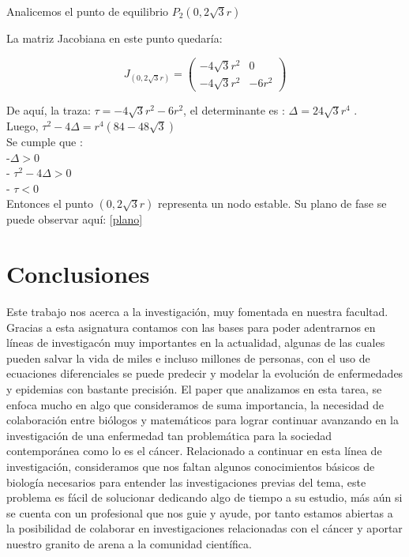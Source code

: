 \documentclass[a4 paper, 12pt]{article}
\begin{document}
Analicemos el punto de equilibrio $ P_{2} (0,2\sqrt{3}r)$

La matriz Jacobiana en este punto quedar\'ia:

\begin{displaymath}
  J_{(0,2\sqrt{3}r)} =    \left(
      \begin{array}{cc}
        - 4 \sqrt{3}r^{2}  & 0  \\
      - 4 \sqrt{3}r^{2} & -6r^2
      \end{array}
    \right)
\end{displaymath}

De aqu\'i, la traza: $\tau = - 4 \sqrt{3}r^{2} -6r^2$, el determinante es : $\Delta = 24 \sqrt{3}r^4$ .\\[10pt]
Luego, $\tau ^2 - 4\Delta =  r^4(84 - 48 \sqrt{3}) $ \\[10pt]
Se cumple que : \\[10pt]
-$\Delta > 0$\\[10pt]
- $\tau ^2 - 4\Delta > 0$ \\[10pt]
- $\tau < 0 $ \\[10pt]
Entonces el punto $(0,2 \sqrt{3}r)$ representa un nodo estable. Su plano de fase se puede observar aqu\'i: \ref{plano}

\section{Conclusiones}
Este trabajo nos acerca a la investigaci\'on, muy fomentada en nuestra facultad. Gracias a esta asignatura contamos con las bases para poder adentrarnos en l\'ineas de investigac\'on muy importantes en la 
actualidad, algunas de las cuales pueden salvar la vida de miles e incluso millones de personas, con el uso de ecuaciones diferenciales se puede predecir y modelar la evoluci\'on de enfermedades y epidemias 
con bastante precisi\'on. El paper que analizamos en esta tarea, se enfoca mucho en algo que consideramos de suma importancia, la necesidad de colaboraci\'on entre bi\'ologos y matem\'aticos para lograr continuar 
avanzando en la investigaci\'on de una enfermedad tan problem\'atica para la sociedad contempor\'anea como lo es el c\'ancer. Relacionado a continuar en esta l\'inea de investigaci\'on, consideramos que nos 
faltan algunos conocimientos b\'asicos de biolog\'ia necesarios para entender las investigaciones previas del tema, este problema es f\'acil de solucionar dedicando algo de tiempo a su estudio, m\'as a\'un 
si se cuenta con un profesional que nos guie y ayude, por tanto estamos abiertas a la posibilidad de colaborar en investigaciones relacionadas con el c\'ancer y aportar nuestro granito de arena a la comunidad
cient\'ifica.
\end{document}
